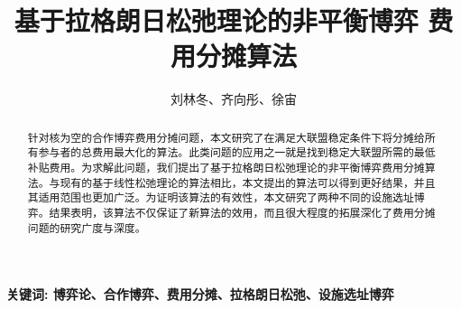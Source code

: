 \documentclass[UTF8]{article}
\author {刘林冬、齐向彤、徐宙}
\title {基于拉格朗日松弛理论的非平衡博弈
费用分摊算法}
\date{}
\begin{document}
    \maketitle
\begin{abstract}
针对核为空的合作博弈费用分摊问题，本文研究了在满足大联盟稳定条件下将分摊给所有参与者的总费用最大化的算法。此类问题的应用之一就是找到稳定大联盟所需的最低补贴费用。为求解此问题，我们提出了基于拉格朗日松弛理论的非平衡博弈费用分摊算法。与现有的基于线性松弛理论的算法相比，本文提出的算法可以得到更好结果，并且其适用范围也更加广泛。为证明该算法的有效性，本文研究了两种不同的设施选址博弈。结果表明，该算法不仅保证了新算法的效用，而且很大程度的拓展深化了费用分摊问题的研究广度与深度。

\end{abstract}
\qquad \textbf{关键词: 博弈论、合作博弈、费用分摊、拉格朗日松弛、设施选址博弈}
\end{document}
